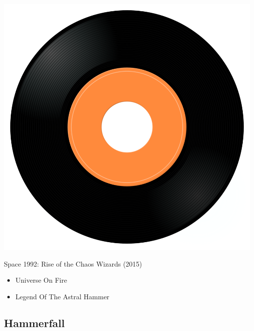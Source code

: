 \begin{minipage}[t]{0.25\textwidth}
\captionsetup{type=figure}
\includegraphics[width=\textwidth]{Images/cover.png}
\caption*{Space 1992: Rise of the Chaos Wizards (2015)}
\end{minipage}
\begin{minipage}[t]{0.25\textwidth}\vspace{0pt}
\begin{itemize}[nosep,leftmargin=1em,labelwidth=*,align=left]
	\setlength{\itemsep}{0pt}
	\item Universe On Fire
	\item Legend Of The Astral Hammer
\end{itemize}
\end{minipage}

\subsection{Hammerfall}

